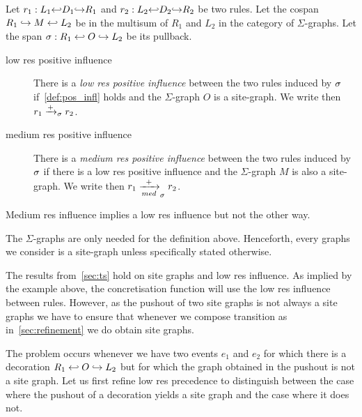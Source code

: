 \begin{definition}
  Let $r_1:L_1{\hookleftarrow} D_1 {\hookrightarrow} R_1$ and $r_2:L_2{\hookleftarrow} D_2 {\hookrightarrow} R_2$ be two rules.
  Let the cospan $R_1\hookrightarrow M\hookleftarrow L_2$ be in the multisum of $R_1$ and $L_2$ in the category of $\Sigma$-graphs. Let the span $\sigma:R_1\hookleftarrow O\hookrightarrow L_2$ be its pullback.
  \begin{description}
  \item[low res positive influence]
    There is a \emph{low res positive influence} between the two rules induced by $\sigma$ if~\autoref{def:pos_infl} holds and the $\Sigma$-graph $O$ is a site-graph.  We write then $r_1\mathrel{\xrightarrow{+}}_{\sigma} r_2$.
  \item[medium res positive influence]
    There is a \emph{medium res positive influence} between the two rules induced by $\sigma$ if there is a low res positive influence and the $\Sigma$-graph $M$ is also a site-graph. We write then $r_1\xrightarrow[med]{+}_{\sigma} r_2$.
  \end{description}
\end{definition}
Medium res influence implies a low res influence but not the other way.

The $\Sigma$-graphs are only needed for the definition above. Henceforth, every graphs we consider is a site-graph unless specifically stated otherwise.

%
The results from~\autoref{sec:ts} hold on site graphs and low res influence. As implied by the example above, the concretisation function will use the low res influence between rules. However, as the pushout of two site graphs is not always a site graphs we have to ensure that whenever we compose transition as in~\autoref{sec:refinement} we do obtain site graphs.

The problem occurs whenever we have two events $e_1$ and $e_2$ for which there is a decoration $R_1\hookleftarrow O\hookrightarrow L_2$ but for which the graph obtained in the pushout is not a site graph. Let us first refine low res precedence to distinguish between the case where the pushout of a decoration yields a site graph and the case where it does not.

